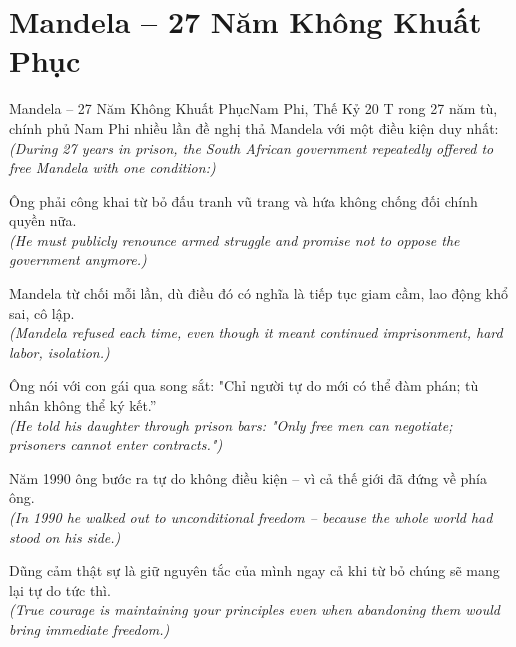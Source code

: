 \section{Mandela -- 27 Năm Không Khuất Phục}
\begin{truyen}{Mandela -- 27 Năm Không Khuất Phục}{Nam Phi, Thế Kỷ 20}
T rong 27 năm tù, chính phủ Nam Phi nhiều lần đề nghị thả Mandela với một điều kiện duy nhất:\\
\textit{(During 27 years in prison, the South African government repeatedly offered to free Mandela with one condition:)}

Ông phải công khai từ bỏ đấu tranh vũ trang và hứa không chống đối chính quyền nữa.\\
\textit{(He must publicly renounce armed struggle and promise not to oppose the government anymore.)}

Mandela từ chối mỗi lần, dù điều đó có nghĩa là tiếp tục giam cầm, lao động khổ sai, cô lập.\\
\textit{(Mandela refused each time, even though it meant continued imprisonment, hard labor, isolation.)}

Ông nói với con gái qua song sắt: "Chỉ người tự do mới có thể đàm phán; tù nhân không thể ký kết.''\\
\textit{(He told his daughter through prison bars: "Only free men can negotiate; prisoners cannot enter contracts.")}

Năm 1990 ông bước ra tự do không điều kiện -- vì cả thế giới đã đứng về phía ông.\\
\textit{(In 1990 he walked out to unconditional freedom -- because the whole world had stood on his side.)}

\end{truyen}
\begin{baihoc}
  Dũng cảm thật sự là giữ nguyên tắc của mình ngay cả khi từ bỏ chúng sẽ mang lại tự do tức thì.\\
  \textit{(True courage is maintaining your principles even when abandoning them would bring immediate freedom.)}
\end{baihoc}

